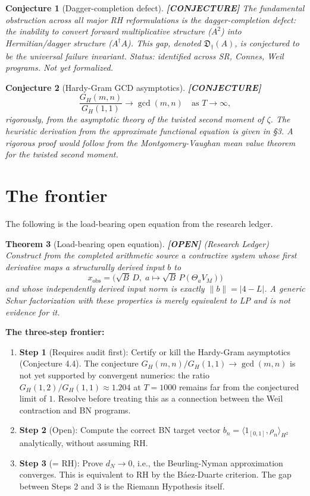 \documentclass[11pt]{article}
\newtheorem{theorem}{Theorem}[section]
\newtheorem{conjecture}[theorem]{Conjecture}
\theoremstyle{remark}
\newcommand{\OPEN}{\textbf{\color{purple}[OPEN]}}
\newcommand{\CONJECTURE}{\textbf{\color{violet}[CONJECTURE]}}
\DeclareRobustCommand{\_}{\ifmmode\text{\textunderscore}\else\textunderscore\allowbreak\fi}
\begin{document}
\begin{conjecture}[Dagger-completion defect] \CONJECTURE{}
The fundamental obstruction across all major RH reformulations is the
\emph{dagger-completion defect}: the inability to convert forward multiplicative
structure ($A^2$) into Hermitian/dagger structure ($A^\dagger A$).
This gap, denoted $\mathfrak{D}_\dagger(A)$, is conjectured to be the universal failure invariant.
Status: identified across SR, Connes, Weil programs. Not yet formalized.
\end{conjecture}

\begin{conjecture}[Hardy-Gram GCD asymptotics] \CONJECTURE{}
\[
\frac{G_H(m,n)}{G_H(1,1)} \to \gcd(m,n) \quad \text{as } T \to \infty,
\]
rigorously, from the asymptotic theory of the twisted second moment of $\zeta$.
The heuristic derivation from the approximate functional equation is given in \S3.
A rigorous proof would follow from the Montgomery-Vaughan mean value theorem
for the twisted second moment.
\end{conjecture}

\section{The frontier}

The following is the load-bearing open equation from the research ledger.

\begin{theorem}[Load-bearing open equation] \OPEN{} (Research Ledger)
Construct from the completed arithmetic source a contractive system
whose first derivative maps a structurally derived input $b$ to
\[
x_{\mathrm{obs}} = \bigl(\sqrt{B}\,D,\; a \mapsto \sqrt{B}\,P(\Theta_a V_M)\bigr)
\]
and whose independently derived input norm is exactly $\|b\| = |4 - L|$.
A generic Schur factorization with these properties is merely equivalent to LP
and is not evidence for it.
\end{theorem}

\textbf{The three-step frontier:}

\begin{enumerate}
\item \textbf{Step 1} (Requires audit first): Certify or kill the Hardy-Gram asymptotics (Conjecture 4.4).
The conjecture $G_H(m,n)/G_H(1,1) \to \gcd(m,n)$ is not yet supported by convergent numerics:
the ratio $G_H(1,2)/G_H(1,1) \approx 1.204$ at $T=1000$ remains far from the conjectured limit of $1$.
Resolve before treating this as a connection between the Weil contraction and BN programs.

\item \textbf{Step 2} (Open): Compute the correct BN target vector $b_n = \langle 1_{[0,1]}, \rho_n\rangle_{H^2}$
analytically, without assuming RH.

\item \textbf{Step 3} (= RH): Prove $d_N \to 0$, i.e., the Beurling-Nyman approximation converges.
This is equivalent to RH by the Báez-Duarte criterion.
The gap between Steps 2 and 3 is the Riemann Hypothesis itself.
\end{enumerate}
\end{document}
